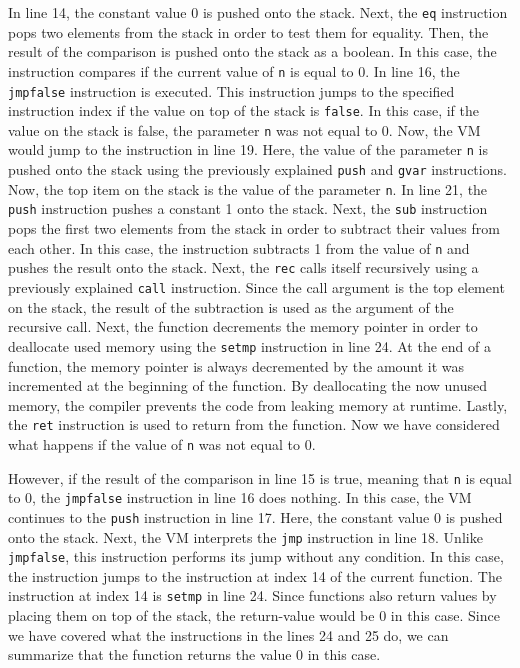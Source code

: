 In line 14, the constant value 0 is pushed onto the stack.
Next, the \texttt{eq} instruction pops two elements from the stack in order to test them for equality.
Then, the result of the comparison is pushed onto the stack as a boolean.
In this case, the instruction compares if the current value of \texttt{n} is equal to 0.
In line 16, the \texttt{jmpfalse} instruction is executed.
This instruction jumps to the specified instruction index if the value on top of the stack is \texttt{false}.
In this case, if the value on the stack is false, the parameter \texttt{n} was not equal to 0.
Now, the VM would jump to the instruction in line 19.
Here, the value of the parameter \texttt{n} is pushed onto the stack using the previously explained \texttt{push} and \texttt{gvar} instructions.
Now, the top item on the stack is the value of the parameter \texttt{n}.
In line 21, the \texttt{push} instruction pushes a constant 1 onto the stack.
Next, the \texttt{sub} instruction pops the first two elements from the stack in order to subtract their values from each other.
In this case, the instruction subtracts 1 from the value of \texttt{n} and pushes the result onto the stack.
Next, the \texttt{rec} calls itself recursively using a previously explained \texttt{call} instruction.
Since the call argument is the top element on the stack, the result of the subtraction is used as the argument of the recursive call.
Next, the function decrements the memory pointer in order to deallocate used memory using the \texttt{setmp} instruction in line 24.
At the end of a function, the memory pointer is always decremented by the amount it was incremented at the beginning of the function.
By deallocating the now unused memory, the compiler prevents the code from leaking memory at runtime.
Lastly, the \texttt{ret} instruction is used to return from the function.
Now we have considered what happens if the value of \texttt{n} was not equal to 0.

However, if the result of the comparison in line 15 is true, meaning that \texttt{n} is equal to 0, the \texttt{jmpfalse} instruction in line 16 does nothing.
In this case, the VM continues to the \texttt{push} instruction in line 17.
Here, the constant value 0 is pushed onto the stack.
Next, the VM interprets the \texttt{jmp} instruction in line 18.
Unlike \texttt{jmpfalse}, this instruction performs its jump without any condition.
In this case, the instruction jumps to the instruction at index 14 of the current function.
The instruction at index 14 is \texttt{setmp} in line 24.
Since functions also return values by placing them on top of the stack, the return-value would be 0 in this case.
Since we have covered what the instructions in the lines 24 and 25 do, we can summarize that the function returns the value 0 in this case.


